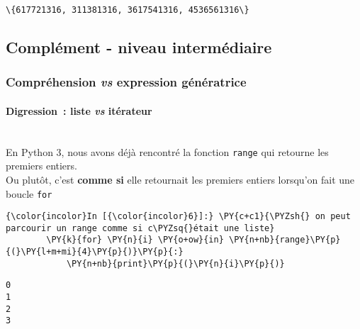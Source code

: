     \begin{Verbatim}[commandchars=\\\{\}]
\{617721316, 311381316, 3617541316, 4536561316\}

    \end{Verbatim}

    \hypertarget{compluxe9ment---niveau-intermuxe9diaire}{%
\subsection{Complément - niveau
intermédiaire}\label{compluxe9ment---niveau-intermuxe9diaire}}

    \hypertarget{compruxe9hension-vs-expression-guxe9nuxe9ratrice}{%
\subsubsection{\texorpdfstring{Compréhension \emph{vs} expression
génératrice}{Compréhension vs expression génératrice}}\label{compruxe9hension-vs-expression-guxe9nuxe9ratrice}}

    \hypertarget{digression-liste-vs-ituxe9rateur}{%
\paragraph{\texorpdfstring{Digression~: liste \emph{vs}
itérateur}{Digression~: liste vs itérateur}\\\\}\label{digression-liste-vs-ituxe9rateur}}

    En Python 3, nous avons déjà rencontré la fonction \texttt{range} qui
retourne les premiers entiers.\\

Ou plutôt, c'est \textbf{comme si} elle retournait les premiers entiers
lorsqu'on fait une boucle \texttt{for}

    \begin{Verbatim}[commandchars=\\\{\}]
{\color{incolor}In [{\color{incolor}6}]:} \PY{c+c1}{\PYZsh{} on peut parcourir un range comme si c\PYZsq{}était une liste}
        \PY{k}{for} \PY{n}{i} \PY{o+ow}{in} \PY{n+nb}{range}\PY{p}{(}\PY{l+m+mi}{4}\PY{p}{)}\PY{p}{:}
            \PY{n+nb}{print}\PY{p}{(}\PY{n}{i}\PY{p}{)}
\end{Verbatim}


    \begin{Verbatim}[commandchars=\\\{\}]
0
1
2
3

    \end{Verbatim}

